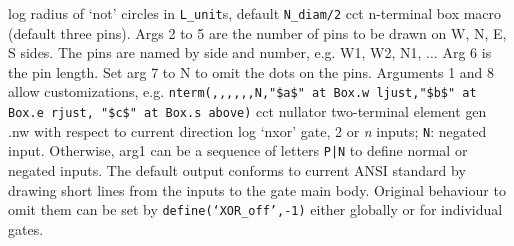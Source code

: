 %
  {log}%
  {radius of `not' circles in {\tt L\_unit}s, default {\tt N\_diam/2}}%
%
  {cct}%
  {n-terminal box macro (default three pins).
   Args 2 to 5 are the number of pins to be drawn on W, N, E, S
   sides.  The pins are named by side and number, e.g. W1, W2, N1,
   $\ldots$ Arg 6 is the pin length.  Set arg 7 to N to omit the
   dots on the pins. Arguments 1 and 8 allow customizations, e.g.
   {\tt nterm(,{,},{,},{,}N,"\$a\$" at Box.w ljust,"\$b\$" at Box.e rjust,
      "\$c\$" at Box.s above)} }%
%
  {cct}%
  { nullator two-terminal element }%
%
  {gen}%
  {.nw with respect to current direction}%
%
  {log}%
  {`nxor' gate, 2 or {\sl n\/} inputs; {\tt N}: negated input.
   Otherwise, arg1 can be a sequence of letters {\tt P|N} to define
   normal or negated inputs.
   The default output conforms to current ANSI standard by drawing short
   lines from the inputs to the gate main body. Original behaviour to
   omit them can be set by {\tt define(`XOR\_off',-1)} either globally
   or for individual gates.
    }%

%

